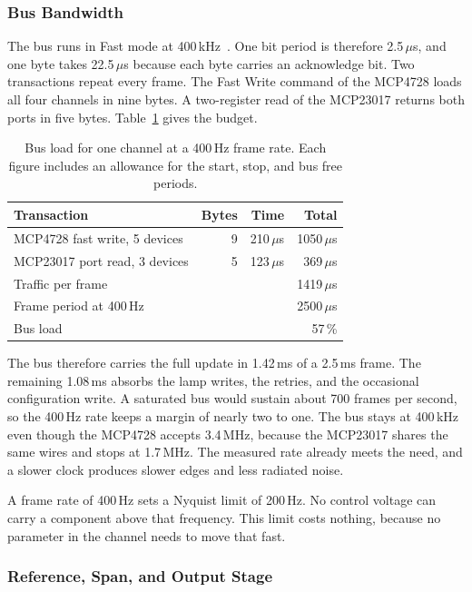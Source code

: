 \documentclass[11pt, letterpaper,titlepage]{article}
\begin{document}
\subsubsection*{Bus Bandwidth}
\label{sssec:bus-bandwidth}

The bus runs in Fast mode at 400\,kHz~\cite{i2cspec}. One bit period is therefore
2.5\,$\mu$s, and one byte takes 22.5\,$\mu$s because each byte carries an
acknowledge bit. Two transactions repeat every frame. The Fast Write command of
the MCP4728 loads all four channels in nine bytes. A two-register read of the
MCP23017 returns both ports in five bytes. Table~\ref{tab:i2c-budget} gives the
budget.

\begin{table}[t]
\centering
\caption{Bus load for one channel at a 400\,Hz frame rate. Each figure includes
an allowance for the start, stop, and bus free periods.}
\label{tab:i2c-budget}
\begin{tabular}{l r r r}
\toprule
\textbf{Transaction} & \textbf{Bytes} & \textbf{Time} & \textbf{Total} \\
\midrule
MCP4728 fast write, 5 devices & 9 & 210\,$\mu$s & 1050\,$\mu$s \\
MCP23017 port read, 3 devices & 5 & 123\,$\mu$s & 369\,$\mu$s \\
\midrule
Traffic per frame & & & 1419\,$\mu$s \\
Frame period at 400\,Hz & & & 2500\,$\mu$s \\
Bus load & & & 57\,\% \\
\bottomrule
\end{tabular}
\end{table}

The bus therefore carries the full update in 1.42\,ms of a 2.5\,ms frame. The
remaining 1.08\,ms absorbs the lamp writes, the retries, and the occasional
configuration write. A saturated bus would sustain about 700 frames per second,
so the 400\,Hz rate keeps a margin of nearly two to one. The bus stays at
400\,kHz even though the MCP4728 accepts 3.4\,MHz, because the MCP23017 shares
the same wires and stops at 1.7\,MHz. The measured rate already meets the need,
and a slower clock produces slower edges and less radiated noise.

A frame rate of 400\,Hz sets a Nyquist limit of 200\,Hz. No control voltage can
carry a component above that frequency. This limit costs nothing, because no
parameter in the channel needs to move that fast.

\subsubsection*{Reference, Span, and Output Stage}
\label{sssec:cv-output}
\end{document}
